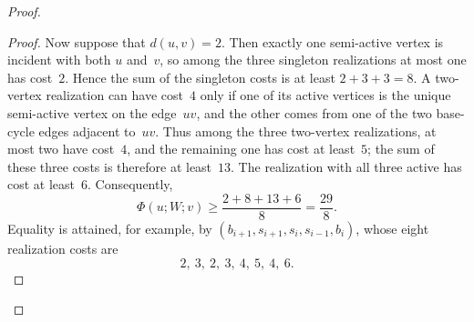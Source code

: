 \documentclass[12pt,a4paper,oneside]{report}
\begin{document}
\begin{proof}
\begin{proof}
Now suppose that $d(u,v)=2$.  Then exactly one semi-active vertex is
incident with both $u$ and~$v$, so among the three singleton realizations
at most one has cost~$2$.  Hence the sum of the singleton costs is at least
$2+3+3=8$.  A two-vertex realization can have cost~$4$ only if one of its
active vertices is the unique semi-active vertex on the edge~$uv$, and the
other comes from one of the two base-cycle edges adjacent to~$uv$.  Thus among the three
two-vertex realizations, at most two have cost~$4$, and the remaining one
has cost at least~$5$; the sum of these three costs is therefore at
least~$13$.  The realization with all three active has cost at least~$6$.
Consequently,
\[
    \Phi(u;W;v)
    \ge\frac{2+8+13+6}{8}
    =\frac{29}{8}.
\]
Equality is attained, for example, by
$(b_{i+1},s_{i+1},s_i,s_{i-1},b_i)$, whose eight realization costs are
\[
    2,\ 3,\ 2,\ 3,\ 4,\ 5,\ 4,\ 6.
\]
\end{proof}


\end{proof}
\end{document}
